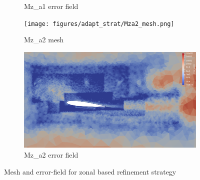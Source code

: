 \begin{figure}[H]
\begin{subfigure}[b]{0.475\textwidth}
\caption{Mz\_a1 error field}
\label{fig:Mza1_err_plot}
\end{subfigure}
\begin{subfigure}[b]{0.475\textwidth}
\centering
\texttt{[image: figures/adapt\_strat/Mza2\_mesh.png]}
\caption{Mz\_a2 mesh}
\label{fig:Mza2_mesh}
\end{subfigure}
\begin{subfigure}[b]{0.475\textwidth}
\centering
\includegraphics[width=1\textwidth]{figures/adapt_strat/Mza2_error_plot.png}
\caption{Mz\_a2 error field}
\label{fig:Mza2_err_plot}
\end{subfigure}
\caption{Mesh and error-field for zonal based refinement strategy}
\end{figure}

